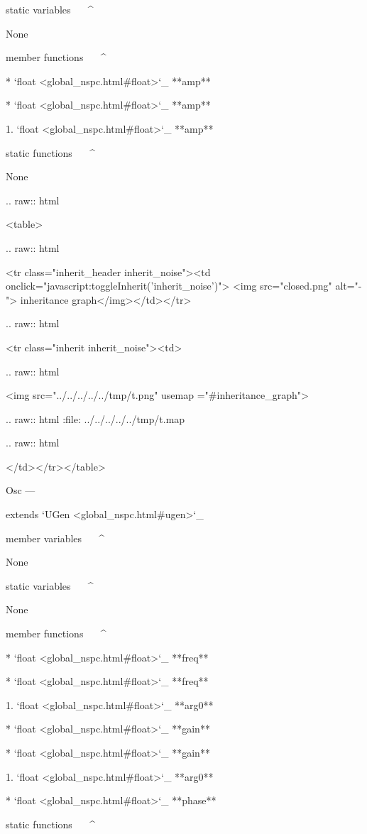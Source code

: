 static variables
^^^^^^^^^^^^^^^^

	None

member functions
^^^^^^^^^^^^^^^^

	* `float <global_nspc.html#float>`_ **amp**

	* `float <global_nspc.html#float>`_ **amp**

		1. `float <global_nspc.html#float>`_ **amp**

static functions
^^^^^^^^^^^^^^^^


	None


  .. raw:: html

   <table>


  .. raw:: html

   <tr class="inherit_header inherit_noise"><td onclick="javascript:toggleInherit('inherit_noise')"> <img src="closed.png" alt="-"> inheritance graph</img></td></tr>


  .. raw:: html

   <tr class="inherit inherit_noise"><td>


  .. raw:: html

   <img src="../../../../../tmp/t.png" usemap ="#inheritance_graph">


  .. raw:: html
   :file:   ../../../../../tmp/t.map


  .. raw:: html

   </td></tr></table>

Osc
---

extends `UGen <global_nspc.html#ugen>`_ 

member variables
^^^^^^^^^^^^^^^^

	None

static variables
^^^^^^^^^^^^^^^^

	None

member functions
^^^^^^^^^^^^^^^^

	* `float <global_nspc.html#float>`_ **freq**

	* `float <global_nspc.html#float>`_ **freq**

		1. `float <global_nspc.html#float>`_ **arg0**

	* `float <global_nspc.html#float>`_ **gain**

	* `float <global_nspc.html#float>`_ **gain**

		1. `float <global_nspc.html#float>`_ **arg0**

	* `float <global_nspc.html#float>`_ **phase**

static functions
^^^^^^^^^^^^^^^^


